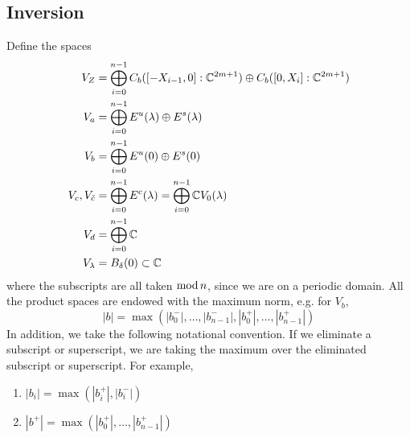 \documentclass[thesis.tex]{subfiles}
\begin{document}
\subsection{Inversion}

Define the spaces
\begin{align*}
V_Z &= \bigoplus_{i=0}^{n-1} C_b([-X_{i-1},0]:\mathbb{C}^{2m+1}) \oplus C_b([0,X_i]:\mathbb{C}^{2m+1})  \\
V_a &= \bigoplus_{i=0}^{n-1} E^u(\lambda) \oplus E^s(\lambda) \\
V_b &= \bigoplus_{i=0}^{n-1} E^u(0) \oplus E^s(0) \\
V_c, V_{\tilde{c}} &= \bigoplus_{i=0}^{n-1} E^c(\lambda) = \bigoplus_{i=0}^{n-1} \mathbb{C} V_0(\lambda) \\
V_d &= \bigoplus_{i=0}^{n-1} \mathbb{C} \\
V_\lambda &= B_\delta(0) \subset \mathbb{C}
\end{align*}
where the subscripts are all taken $\mathop\mathrm{mod}\nolimits n$, since we are on a periodic domain. All the product spaces are endowed with the maximum norm, e.g. for $V_b$, 
\[
|b| = \max(|b_0^-|, \dots, |b_{n-1}^-|, |b_0^+|, \dots, |b_{n-1}^+|)
\]
In addition, we take the following notational convention. If we eliminate a subscript or superscript, we are taking the maximum over the eliminated subscript or superscript. For example,
\begin{enumerate}
	\item $|b_i| = \max(|b_i^+|, |b_i^-|)$ 
	\item $|b^+| = \max(|b_0^+|, \dots, |b_{n-1}^+|)$
\end{enumerate}
\end{document}

